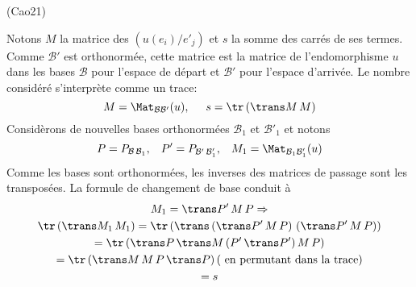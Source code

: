 \begin{tiny}(Cao21)\end{tiny} Notons $M$ la matrice des $(u(e_i)/e'_j)$ et $s$ la somme des carrés de ses termes. Comme $\mathcal{B}'$ est orthonormée, cette matrice est la matrice de l'endomorphisme $u$ dans les bases $\mathcal{B}$ pour l'espace de départ et $\mathcal{B}'$ pour l'espace d'arrivée. Le nombre considéré s'interprète comme un trace:
\begin{displaymath}
  M = \Mat_{\mathcal{B}\mathcal{B}'}(u),\hspace{0.5cm} s = \tr\left( \trans M\, M\right) 
\end{displaymath}
Considèrons de nouvelles bases orthonormées $\mathcal{B}_1$ et $\mathcal{B}'_1$ et notons
\begin{displaymath}
P = P_{\mathcal{B}\,\mathcal{B}_1}, \hspace{0.3cm}  
P' = P_{\mathcal{B}'\,\mathcal{B}'_1}, \hspace{0.3cm}
M_1 = \Mat_{\mathcal{B}_1\mathcal{B}'_1}(u)
\end{displaymath}
Comme les bases sont orthonormées, les inverses des matrices de passage sont les transposées. La formule de changement de base conduit à
\begin{multline*}
  M_1 = \trans P'\, M\, P \Rightarrow \\
\tr\left( \trans M_1\, M_1\right)
= \tr\left( \trans \left( \trans P'\, M\, P\right) \, \left( \trans P'\, M\, P\right)\right) \\
= \tr\left( \trans P\, \trans M\, (P'\, \trans P')\, M\, P\right) \\
= \tr\left( \trans M\, M\, P\, \trans P\right) \text{( en permutant dans la trace)}\\
= s
\end{multline*}
